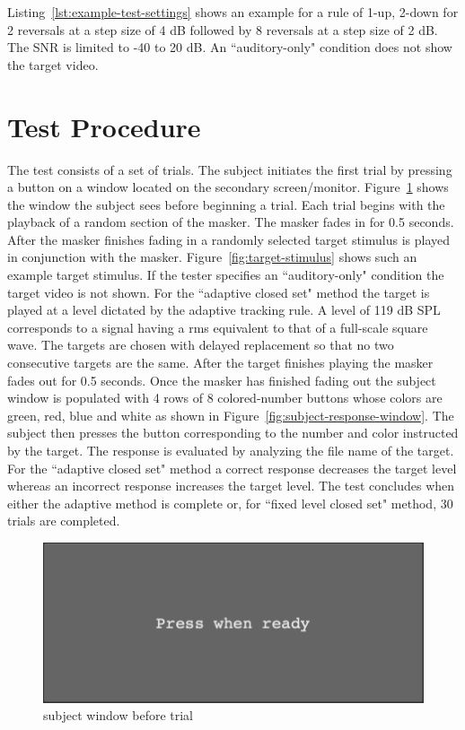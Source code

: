 \documentclass[11pt,pdftex,letterpaper]{article}
\begin{document}
Listing~\ref{lst:example-test-settings} shows an example for a rule of 1-up, 2-down for 2 reversals at a step size of 4 dB followed by 8 reversals at a step size of 2 dB. The SNR is limited to -40 to 20 dB. An ``auditory-only" condition does not show the target video.

\section{Test Procedure}
The test consists of a set of trials. The subject initiates the first trial by pressing a button on a window located on the secondary screen/monitor. Figure~\ref{fig:subject-ready-window} shows the window the subject sees before beginning a trial. Each trial begins with the playback of a random section of the masker. The masker fades in for 0.5 seconds. After the masker finishes fading in a randomly selected target stimulus is played in conjunction with the masker. Figure~\ref{fig:target-stimulus} shows such an example target stimulus.
If the tester specifies an ``auditory-only" condition the target video is not shown. For the ``adaptive closed set" method the target is played at a level dictated by the adaptive tracking rule. A level of 119 dB SPL corresponds to a signal having a rms equivalent to that of a full-scale square wave. The targets are chosen with delayed replacement so that no two consecutive targets are the same. After the target finishes playing the masker fades out for 0.5 seconds. Once the masker has finished fading out the subject window is populated with 4 rows of 8 colored-number buttons whose colors are green, red, blue and white as shown in Figure~\ref{fig:subject-response-window}. The subject then presses the button corresponding to the number and color instructed by the target. The response is evaluated by analyzing the file name of the target. For the ``adaptive closed set" method a correct response decreases the target level whereas an incorrect response increases the target level. The test concludes when either the adaptive method is complete or, for ``fixed level closed set" method, 30 trials are completed.

\begin{figure}
\centering
\includegraphics[width = 0.9\linewidth]{subject-ready-window.png}
\caption{subject window before trial}
\label{fig:subject-ready-window}
\end{figure}
\end{document}
